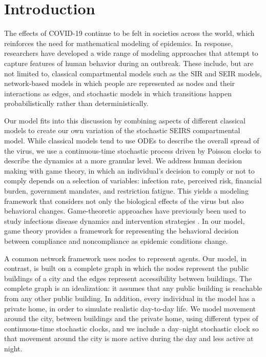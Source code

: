 \documentclass[11pt]{article}
\theoremstyle{definition}
\theoremstyle{plain}
\begin{document}
\section{Introduction}

The effects of COVID-19 continue to be felt in societies across the world, which reinforces the need for mathematical modeling of epidemics. In response, researchers have developed a wide range of modeling approaches that attempt to capture features of human behavior during an outbreak. These include, but are not limited to, classical compartmental models such as the SIR and SEIR models, network-based models in which people are represented as nodes and their interactions as edges, and stochastic models in which transitions happen probabilistically rather than deterministically.

Our model fits into this discussion by combining aspects of different classical models to create our own variation of the stochastic SEIRS compartmental model. While classical models tend to use ODEs to describe the overall spread of the virus, we use a continuous-time stochastic process driven by Poisson clocks to describe the dynamics at a more granular level. We address human decision making with game theory, in which an individual's decision to comply or not to comply depends on a selection of variables: infection rate, perceived risk, financial burden, government mandates, and restriction fatigue. This yields a modeling framework that considers not only the biological effects of the virus but also behavioral changes. Game-theoretic approaches have previously been used to study infectious
disease dynamics and intervention strategies \cite{chang2020}. In our model,
game theory provides a framework for representing the behavioral decision
between compliance and noncompliance as epidemic conditions change.

A common network framework uses nodes to represent agents. Our model, in contrast, is built on a complete graph in which the nodes represent the public buildings of a city and the edges represent accessibility between buildings. The complete graph is an idealization: it assumes that any public building is reachable from any other public building. In addition, every individual in the model has a private home, in order to simulate realistic day-to-day life. We model movement around the city, between buildings and the private home, using different types of continuous-time stochastic clocks, and we include a day--night stochastic clock so that movement around the city is more active during the day and less active at night.
\end{document}
